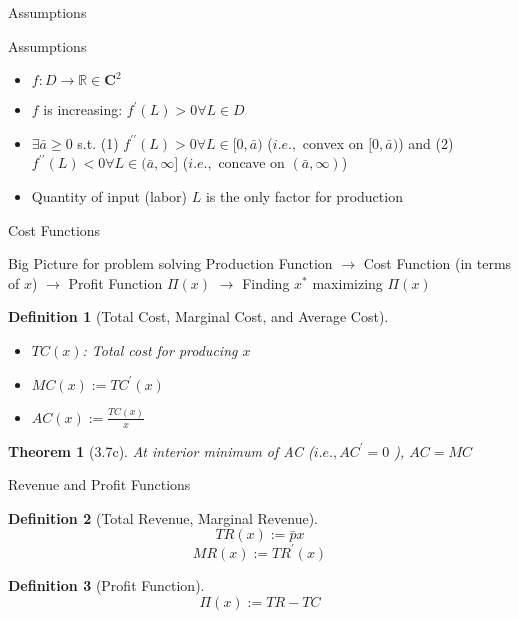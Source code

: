 \documentclass[a4paper,11pt]{article}
\newtheorem{defn}{Definition}
\newtheorem{thm}{Theorem}
\begin{document}
\begin{frame}[t]{Assumptions}
	\begin{block}
		{Assumptions}
		\begin{itemize}
			\item $f:D\rightarrow\mathbb{R}\in \mathbf{C}^2$
			\item $f$ is increasing: $f^\prime(L) >0 \forall L\in D$
			\item $\exists \bar a\ge 0$ s.t. (1) $f^{\prime\prime}(L)>0 \forall L\in[0,\bar a)$ ($i.e.,$ convex on $[0,\bar a)$) and (2) $f^{\prime\prime}(L)<0 \forall L\in(\bar a,\infty]$ ($i.e.,$ concave on $(\bar a,\infty)$)
			\item Quantity of input (labor) $L$ is the only factor for production
		\end{itemize}
	\end{block}

\end{frame}


\begin{frame}[t]{Cost Functions}
	\begin{block}
		{Big Picture for problem solving}
		Production Function $\rightarrow$ Cost Function (in terms of $x$) $\rightarrow$ Profit Function $\Pi(x)$ $\rightarrow$ Finding $x^\ast$ maximizing $\Pi(x)$
	\end{block}
	
	\begin{defn}
		[Total Cost, Marginal Cost, and Average Cost]
		\begin{itemize}
			\item $TC(x)$: Total cost for producing $x$
			\item $MC(x):= TC^\prime(x)$
			\item $AC(x):= \frac{TC(x)}{x}$
		\end{itemize}
	\end{defn}
	
	\begin{thm}
		[3.7c]
		At interior minimum of AC ($i.e.,AC^\prime=0$ ), $AC=MC$
	\end{thm}
\end{frame}

\begin{frame}[t]{Revenue and Profit Functions}
	\begin{defn}
		[Total Revenue, Marginal Revenue]
		\[
			TR(x) := \bar p x
		\]
		\[
			MR(x) := TR^\prime (x)
		\]
	\end{defn}
	\begin{defn}
		[Profit Function]
		\[
			\Pi(x) := TR-TC
		\]
	\end{defn}
\end{frame}
\end{document}
